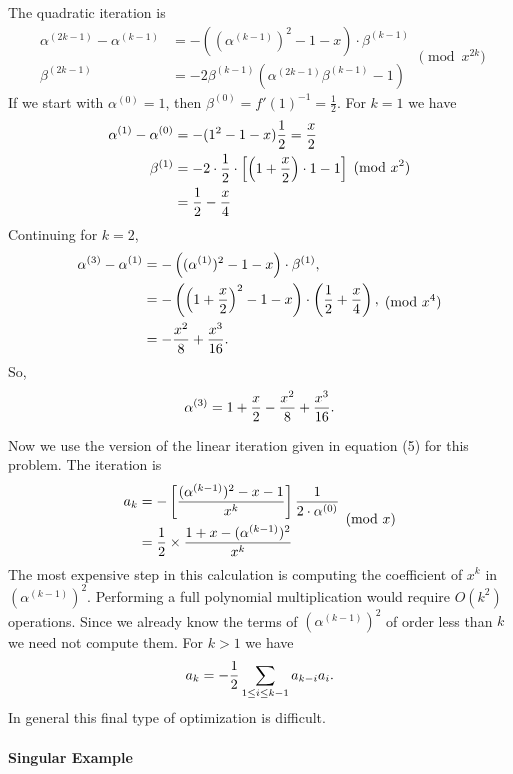 The quadratic iteration is
\[
\begin{aligned}
  \alpha^{(2k-1)} - \alpha^{(k-1)} &= - 
    ((\alpha^{(k-1)})^2 - 1 - x) \cdot \beta^{(k-1)}\\
  \beta^{(2k-1)} &= -2 \beta^{(k-1)} (\alpha^{(2k-1)} \beta^{(k-1)} -1)
\end{aligned}\pmod{x^{2k}}
\]
If we start with $\alpha^{(0)} = 1$, then $\beta^{(0)} = f'(1)^{-1} =
\frac{1}{2}$.  For $k = 1$ we have
\[
\begin{aligned}
  \alpha^{(1)} - \alpha^{(0)} & = - (1^2 - 1 -x) {1 \over 2} = \frac{x}{2}\\
    \beta^{(1)} &= - 2 \cdot {1 \over 2} \cdot \left[ \left(1 + {x \over 2}\right)
    \cdot 1 - 1\right]\\
   & = {1\over 2} - {x \over 4}
\end{aligned}
\pmod{x^{2}}
\]
Continuing for $k = 2$,
\[
\begin{aligned}
  \alpha^{(3)} - \alpha^{(1)} 
    & = - \left( (\alpha^{(1)})^2 - 1 - x\right) \cdot \beta^{(1)}, \\
    &= - \left(\left(1 + \frac{x}{2}\right)^2 - 1 - x\right)
    \cdot \left({1 \over 2} + {x \over 4}\right),\\
    & = - {x^2 \over 8} + {x^3 \over 16}.
\end{aligned}
\pmod{x^4}
\]
So,
\[
\alpha^{(3)} = 1 + {x \over 2} - {x^2 \over 8} + {x^3 \over 16}.
\]

Now we use the version of the linear iteration given in equation (5) for
this problem.  The iteration is
\[
\begin{aligned}
  a_k &= - \left[ {(\alpha^{(k-1)})^2 - x - 1 \over x^k}\right] {1 \over
      2 \cdot \alpha^{(0)}}\\
    &= {1 \over 2} \times { 1 + x - (\alpha^{(k-1)})^2 \over x^k}
\end{aligned}
\pmod{x}
\]
The most expensive step in this calculation is computing the coefficient of
$x^k$ in $(\alpha^{(k-1)})^2$.  Performing a full polynomial multiplication
would require $O(k^2)$ operations.  Since we already know the terms of
$(\alpha^{(k-1)})^2$ of order less than $k$ we need not compute them.  For $k >
1$ we have
\[
a_k = - {1 \over 2} \sum_{1 \le i \le k-1} a_{k-i} a_i.
\]
In general this final type of optimization is difficult.

\paragraph{Singular Example}

